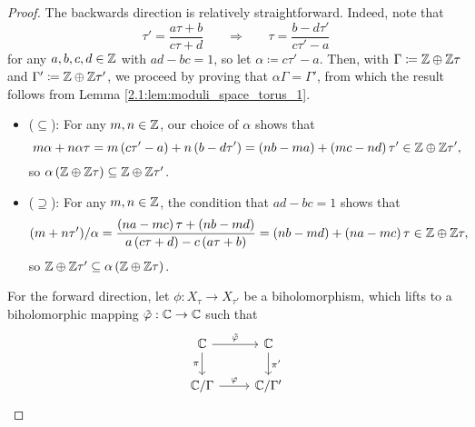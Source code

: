 \documentclass[../Moduli_Spaces_of_Riemann_Surfaces.tex]{subfiles}
\begin{document}
    \begin{proof}
        The backwards direction is relatively straightforward. Indeed, note that
        \begin{equation*}
            \tau'=\frac{a\tau+b}{c\tau+d}\ \ \ \ \ \ \ \ \Rightarrow\ \ \ \ \ \ \ \ \tau=\frac{b-d\tau'}{c\tau'-a}
        \end{equation*}
        for any $a,b,c,d\in\mathbb{Z}$ with $ad-bc=1$, so let $\alpha\coloneqq c\tau'-a$. Then, with $\Gamma\coloneqq\mathbb{Z}\oplus\mathbb{Z}\tau$ and $\Gamma'\coloneqq\mathbb{Z}\oplus\mathbb{Z}\tau'$, we proceed by proving that $\alpha\Gamma=\Gamma'$, from which the result follows from Lemma \ref{2.1:lem:moduli_space_torus_1}.
        \begin{itemize}
            \item ($\subseteq$): For any $m,n\in\mathbb{Z}$, our choice of $\alpha$ shows that
                \begin{equation*}
                    m\alpha+n\alpha\tau=m\left(c\tau'-a\right)+n\left(b-d\tau'\right)=\left(nb-ma\right)+\left(mc-nd\right)\tau'\in\mathbb{Z}\oplus\mathbb{Z}\tau',
                \end{equation*}
                so $\alpha\left(\mathbb{Z}\oplus\mathbb{Z}\tau\right)\subseteq\mathbb{Z}\oplus\mathbb{Z}\tau'$.
            \item ($\supseteq$): For any $m,n\in\mathbb{Z}$, the condition that $ad-bc=1$ shows that
                \begin{equation*}
                    \left(m+n\tau'\right)\!/\alpha=\frac{\left(na-mc\right)\tau+\left(nb-md\right)}{a\left(c\tau+d\right)-c\left(a\tau+b\right)}=\left(nb-md\right)+\left(na-mc\right)\tau\in\mathbb{Z}\oplus\mathbb{Z}\tau,
                \end{equation*}
                so $\mathbb{Z}\oplus\mathbb{Z}\tau'\subseteq\alpha\left(\mathbb{Z}\oplus\mathbb{Z}\tau\right)$.
        \end{itemize}
        For the forward direction, let $\phi:X_\tau\to X_{\tau'}$ be a biholomorphism, which lifts to a biholomorphic mapping $\tilde{\varphi}:\mathbb{C}\to\mathbb{C}$ such that
        \begin{equation*}
            \begin{tikzcd}
                \C \ar[r, "\tilde{\phi}"] \ar[d, "\pi"'] & \C \ar[d, "\pi'"] \\
                \C/\Gamma \ar[r, "\phi"] & \C/\Gamma'
            \end{tikzcd}           
        \end{equation*}

\end{proof}
\end{document}
